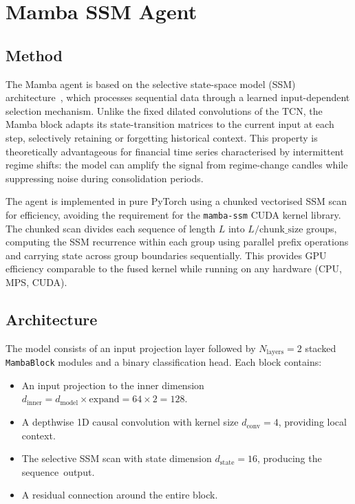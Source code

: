 \section{Mamba SSM Agent}
\label{sec:mamba_agent}

\subsection{Method}

The Mamba agent is based on the selective state-space model (SSM) architecture~\cite{gu2023mamba}, which processes sequential data through a learned input-dependent selection mechanism. Unlike the fixed dilated convolutions of the TCN, the Mamba block adapts its state-transition matrices to the current input at each step, selectively retaining or forgetting historical context. This property is theoretically advantageous for financial time series characterised by intermittent regime shifts: the model can amplify the signal from regime-change candles while suppressing noise during consolidation periods.


The agent is implemented in pure PyTorch using a chunked vectorised SSM scan for efficiency, avoiding the requirement for the \texttt{mamba-ssm} CUDA kernel library. The chunked scan divides each sequence of length $L$ into $L / \text{chunk\_size}$ groups, computing the SSM recurrence within each group using parallel prefix operations and carrying state across group boundaries sequentially. This provides GPU efficiency comparable to the fused kernel while running on any hardware (CPU, MPS, CUDA).

\subsection{Architecture}

The model consists of an input projection layer followed by $N_{\text{layers}} = 2$ stacked \texttt{MambaBlock} modules and a binary classification head. Each block contains:
\begin{itemize}
    \item An input projection to the inner dimension $d_{\text{inner}} = d_{\text{model}} \times \text{expand} = 64 \times 2 = 128$.
    \item A depthwise 1D causal convolution with kernel size $d_{\text{conv}} = 4$, providing local context.
    \item The selective SSM scan with state dimension $d_{\text{state}} = 16$, producing the sequence~output.
    \item A residual connection around the entire block.
\end{itemize}

